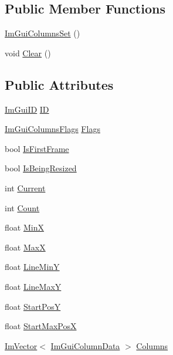 \subsection*{Public Member Functions}
\begin{DoxyCompactItemize}
\item 
\mbox{\hyperlink{struct_im_gui_columns_set_a151a94550f1575639b6f8be0d63b7caa}{Im\+Gui\+Columns\+Set}} ()
\item 
void \mbox{\hyperlink{struct_im_gui_columns_set_acbaeb17ee3c2026ff36ecba69906eb6c}{Clear}} ()
\end{DoxyCompactItemize}
\subsection*{Public Attributes}
\begin{DoxyCompactItemize}
\item 
\mbox{\hyperlink{imgui_8h_a1785c9b6f4e16406764a85f32582236f}{Im\+Gui\+ID}} \mbox{\hyperlink{struct_im_gui_columns_set_af0d52f764471e070d0beca0526090e10}{ID}}
\item 
\mbox{\hyperlink{imgui_8h_a0edb3053546fcf6c5f7dcb7531c3a17a}{Im\+Gui\+Columns\+Flags}} \mbox{\hyperlink{struct_im_gui_columns_set_adb2a5aea8ba94e54502d71844ec3e23b}{Flags}}
\item 
bool \mbox{\hyperlink{struct_im_gui_columns_set_a814bdfd8c72548d2c93675c8d6e974e9}{Is\+First\+Frame}}
\item 
bool \mbox{\hyperlink{struct_im_gui_columns_set_af9ef4186dd06147173a0e1dc12085399}{Is\+Being\+Resized}}
\item 
int \mbox{\hyperlink{struct_im_gui_columns_set_a6a8816ed50ec3ca5d673b25b667d845f}{Current}}
\item 
int \mbox{\hyperlink{struct_im_gui_columns_set_aaa3e86fc2582a6bb749172a04b9d934c}{Count}}
\item 
float \mbox{\hyperlink{struct_im_gui_columns_set_a953e9dc01eab7503a48644e051b61476}{MinX}}
\item 
float \mbox{\hyperlink{struct_im_gui_columns_set_acea08c0e12158b9db78d499f1bb1242b}{MaxX}}
\item 
float \mbox{\hyperlink{struct_im_gui_columns_set_a6210b01b3a698c717dc7609a9e497074}{Line\+MinY}}
\item 
float \mbox{\hyperlink{struct_im_gui_columns_set_a55ecc0a1b27e495f154c3c939524c330}{Line\+MaxY}}
\item 
float \mbox{\hyperlink{struct_im_gui_columns_set_a32611b7e09fb2dbdcc5342fecc3a0f6c}{Start\+PosY}}
\item 
float \mbox{\hyperlink{struct_im_gui_columns_set_a61470bb069a752930fc8a838e9f552d3}{Start\+Max\+PosX}}
\item 
\mbox{\hyperlink{class_im_vector}{Im\+Vector}}$<$ \mbox{\hyperlink{struct_im_gui_column_data}{Im\+Gui\+Column\+Data}} $>$ \mbox{\hyperlink{struct_im_gui_columns_set_a7922acd94294791c3babf3ee92896d08}{Columns}}
\end{DoxyCompactItemize}


